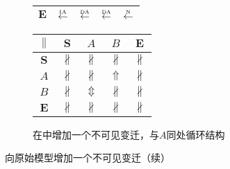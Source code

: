 \begin{figure}[htbp]
\begin{subfigure}{1\textwidth}
\begin{minipage}[b]{0.3\textwidth}
\begin{tabular}{|c|c|c|c|c|}
        $\bm{E}$ & $\overset{\text{\tiny{IA}}}{\leftarrow}$ & $\overset{\text{\tiny{DA}}}{\leftarrow}$ & $\overset{\text{\tiny{DA}}}{\leftarrow}$ & $\overset{\text{\tiny{N}}}{\leftarrow}$\\ \hline
      \end{tabular}
    \end{minipage}
    \begin{minipage}[b]{0.3\textwidth}
      \vspace{1em}
      \centering
      \begin{tabular}{|c|c|c|c|c|} \hline
        $\parallel$ & $\bm{S}$ & $A$ & $B$ & $\bm{E}$\\ \hline
        $\bm{S}$ & $\nparallel$ & $\nparallel$ & $\nparallel$ & $\nparallel$\\ \hline
        $A$ & $\nparallel$ & $\nparallel$ & $\Uparrow$ & $\nparallel$\\ \hline
        $B$ & $\nparallel$ & $\Updownarrow$ & $\nparallel$ & $\nparallel$\\ \hline
        $\bm{E}$ & $\nparallel$ & $\nparallel$ & $\nparallel$ & $\nparallel$\\ \hline
      \end{tabular}
    \end{minipage}
    \caption{在中增加一个不可见变迁，与$A$同处循环结构}
    \label{fig:uniqueness_3_i}
  \end{subfigure}

  \vspace{6pt}
  \caption{向原始模型增加一个不可见变迁（续）}
  \label{fig:uniqueness_3}
\end{figure}